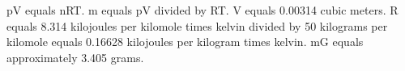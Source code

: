 pV equals nRT.  
m equals pV divided by RT.  
V equals 0.00314 cubic meters.  
R equals 8.314 kilojoules per kilomole times kelvin divided by 50 kilograms per kilomole equals 0.16628 kilojoules per kilogram times kelvin.  
mG equals approximately 3.405 grams.